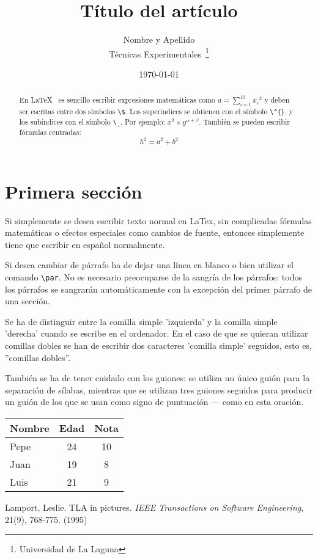 \documentclass[a4paper,12pt]{article}
\begin{document}
\title{Título del artículo}
\author{Nombre y Apellido \\
        Técnicas Experimentales~\footnote{Universidad de La Laguna}
       }
\date{\today}
\maketitle
\begin{abstract}
  En \LaTeX{}~\cite{Lam:86} es sencillo escribir expresiones
  matemáticas como $a=\sum_{i=1}^{10} {x_i}^{3}$
  y deben ser escritas entre dos símbolos \verb|\$|.
  Los superíndices se obtienen con el símbolo \verb|\^{}|, y
  los subíndices con el símbolo \verb|\_|.
  Por ejemplo: $x^2 \times y^{\alpha + \beta}$.
  También se pueden escribir fórmulas centradas:
  \[h^2=a^2 + b^2 \]
\end{abstract}

\section{Primera sección}
\par Si simplemente se desea escribir texto normal en LaTex,
sin complicadas f\'ormulas matem\'aticas o efectos especiales
como cambios de fuente, entonces simplemente tiene que escribir
en espa\~nol normalmente.
\par Si desea cambiar de p\'arrafo ha de dejar una l\'inea en blanco o bien
utilizar el comando \verb|\par|.
No es necesario preocuparse de la sangr\'ia de los p\'arrafos:
todos los p\'arrafos se sangrar\'an autom\'aticamente con la excepci\'on
del primer p\'arrafo de una secci\'on.

Se ha de distinguir entre la comilla simple 'izquierda'
y la comilla simple 'derecha' cuando se escribe en el ordenador.
En el caso de que se quieran utilizar comillas dobles se han de
escribir dos caracteres 'comilla simple' seguidos, esto es,
''comillas dobles''.

Tambi\'en se ha de tener cuidado con los guiones: se utiliza un \'unico
gui\'on para la separaci\'on de s\'ilabas, mientras que se utilizan
tres guiones seguidos para producir un gui\'on de los que se usan
como signo de puntuaci\'on --- como en esta oraci\'on.

\bigskip
\begin{tabular}{|l|c|c|}
\hline
  Nombre & Edad & Nota \\ \hline
  Pepe   &   24 &   10 \\ \hline
  Juan   &   19 &    8 \\ \hline
  Luis   &   21 &    9 \\ \hline
\end{tabular}
\begin{thebibliography}{00}
    Lamport, Leslie.
    TLA in pictures.
    \emph{IEEE Transactions on Software Engineering},
    21(9), 768-775.
    (1995)
\end{thebibliography}
\end{document}

